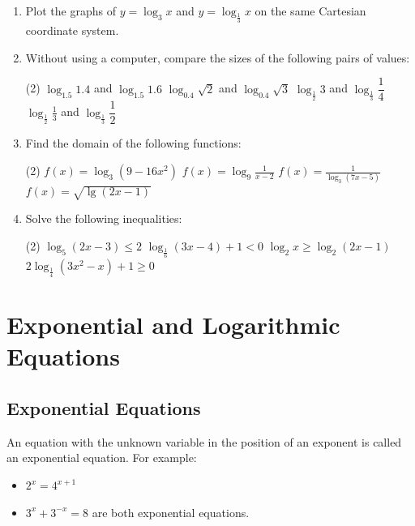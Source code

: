 \documentclass{report}
\begin{document}
        \begin{enumerate}
            \item Plot the graphs of $y=\log _3 x$ and $y=\log _{\frac{1}{3}} x$ on the same Cartesian coordinate system.
            \item Without using a computer, compare the sizes of the following pairs of values:
            \begin{tasks}[label=(\alph*)](2)
                \task $\displaystyle\log _{1.5} 1.4$ and $\log _{1.5} 1.6$
                \task $\displaystyle\log _{0.4} \sqrt{2}$ and $\log _{0.4} \sqrt{3}$
                \task $\displaystyle\log _{\frac{1}{2}} 3$ and $\log _{\frac{1}{3}} \dfrac{1}{4}$
                \task $\displaystyle\log _{\frac{1}{2}} \frac{1}{3}$ and $\log _{\frac{1}{3}} \dfrac{1}{2}$
            \end{tasks}
            \item Find the domain of the following functions:
            \begin{tasks}[label=(\alph*)](2)
                \task $\displaystyle f(x)=\log _3\left(9-16 x^2\right)$
                \task $\displaystyle f(x)=\log _9 \frac{1}{x-2}$
                \task $\displaystyle f(x)=\frac{1}{\log _3(7 x-5)}$
                \task $\displaystyle f(x)=\sqrt{\lg (2 x-1)}$
            \end{tasks}
            \item Solve the following inequalities:
            \begin{tasks}[label=(\alph*)](2)
                \task $\log _5(2 x-3) \leq 2$
                \task $\log _{\frac{1}{6}}(3 x-4)+1<0$
                \task $\log _2 x \geq \log _2(2 x-1)$
                \task $2 \log _{\frac{1}{4}}\left(3 x^2-x\right)+1 \geq 0$
            \end{tasks}
        \end{enumerate}

        \newpage
        \section{Exponential and Logarithmic Equations}

        \subsection*{Exponential Equations}

        An equation with the unknown variable in the position of an exponent is called an exponential equation. For example:
        \vspace{-2em}
        \begin{itemize}
            \item $2^x=4^{x+1}$
            \item $3^x+3^{-x}=8$ are both exponential equations.
        \end{itemize}
\end{document}
